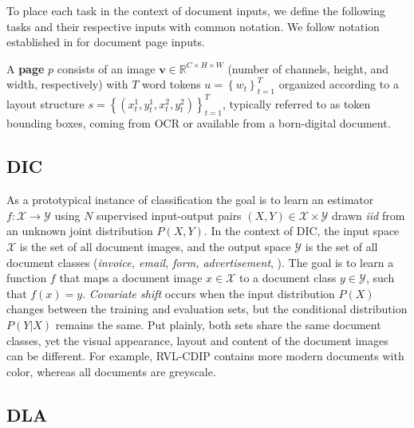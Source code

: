 To place each task in the context of document inputs, we define the following tasks and their respective inputs with common notation.
We follow notation established in \cite{van2023beyond} for document page inputs.

A \textbf{page} $p$ consists of an image $\boldsymbol{v} \in \mathbb{R}^{C \times H \times W}$ (number of channels, height, and width, respectively) with $T$ word tokens $u = \left\{w_t\right\}_{t=1}^T$ organized according to a layout structure $s = \left\{\left(x_t^1, y_t^1, x_t^2, y_t^2\right)\right\}_{t=1}^T$, typically referred to as token bounding boxes, coming from OCR or available from a born-digital document.

\subsection{DIC}\label{sec:supp-taskdef_dic}

As a prototypical instance of classification \cite{vapnik1992principles} the goal is to learn an estimator $f: \mathcal{X} \to \mathcal{Y}$ using $N$ supervised input-output pairs $(X,Y) \in \mathcal{X} \times \mathcal{Y}$ drawn \textit{iid} from an unknown joint distribution $P(X,Y)$.
In the context of DIC, the input space $\mathcal{X}$ is the set of all document images, and the output space $\mathcal{Y}$ is the set of all document classes (\eg \textit{invoice, email, form, advertisement}, \etc). The goal is to learn a function $f$ that maps a document image $x \in \mathcal{X}$ to a document class $y \in \mathcal{Y}$, such that $f(x) = y$.
\textit{Covariate shift} \cite{shimodaira2000improving} occurs when the input distribution $P(X)$ changes between the training and evaluation sets, but the conditional distribution $P(Y|X)$ remains the same. Put plainly, both sets share the same document classes, yet the visual appearance, layout and content of the document images can be different. For example, RVL-CDIP \cite{larson2022evaluating} contains more modern documents with color, whereas all \rvl{} documents are greyscale.

\subsection{DLA}\label{sec:supp-taskdef_dla}

